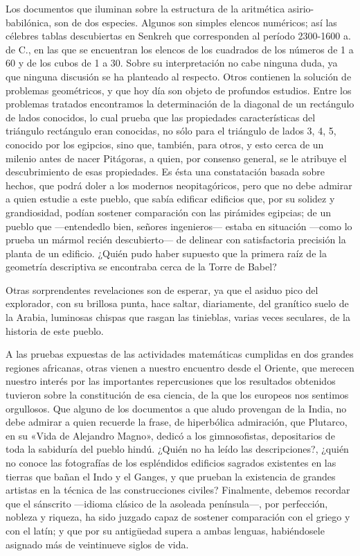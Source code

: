 \documentclass[a4paper, 12pt, draft]{article}
\begin{document}
Los documentos que iluminan sobre la estructura de la aritmética asirio-babilónica, son de dos especies. Algunos son simples elencos numéricos; así las célebres tablas descubiertas en Senkreh que corresponden al período 2300-1600 a. de C., en las que se encuentran los elencos de los cuadrados de los números de 1 a 60 y de los cubos de 1 a 30. Sobre su interpretación no cabe ninguna duda, ya que ninguna discusión se ha planteado al respecto. Otros contienen la solución de problemas geométricos, y que hoy día son objeto de profundos estudios. Entre
los problemas tratados encontramos la determinación de la diagonal de un rectángulo de lados conocidos, lo cual prueba que las propiedades características del triángulo rectángulo eran conocidas, no sólo para el triángulo de lados 3, 4, 5, conocido por los egipcios, sino que, también, para otros, y esto cerca de un milenio antes de nacer Pitágoras, a quien, por consenso general, se le atribuye el descubrimiento de esas propiedades. Es ésta una constatación basada sobre hechos, que podrá doler a los modernos neopitagóricos, pero que no debe admirar a quien estudie a este pueblo, que sabía edificar edificios que, por su solidez y grandiosidad, podían sostener comparación con las pirámides egipcias; de un pueblo que ---entendedlo bien, señores ingenieros--- estaba en situación ---como lo prueba un mármol recién descubierto--- de delinear con satisfactoria precisión la planta de un edificio. ¿Quién pudo haber supuesto que la primera raíz de la geometría descriptiva se encontraba cerca de la Torre de Babel?




Otras sorprendentes revelaciones son de esperar, ya que el asiduo pico del explorador, con su brillosa punta, hace saltar, diariamente, del granítico suelo de la Arabia, luminosas chispas que rasgan las tinieblas, varias veces seculares, de la historia de este pueblo.


A las pruebas expuestas de las actividades matemáticas cumplidas en dos grandes regiones africanas, otras vienen a nuestro encuentro desde el Oriente, que merecen nuestro interés por las importantes repercusiones que los resultados obtenidos tuvieron sobre la constitución de esa ciencia, de la que los europeos nos sentimos orgullosos. Que alguno de los documentos a que aludo provengan de la India, no debe admirar a quien recuerde la frase, de hiperbólica admiración, que Plutarco, en su «Vida de Alejandro Magno», dedicó a los gimnosofistas, depositarios de toda la sabiduría del pueblo hindú. ¿Quién no ha leído las descripciones?, ¿quién no conoce las fotografías de los espléndidos edificios sagrados existentes en las tierras que bañan el Indo y el Ganges, y que prueban la existencia de grandes artistas en la técnica de las construcciones civiles? Finalmente, debemos recordar que el sánscrito ---idioma clásico de la asoleada península---, por perfección, nobleza y riqueza, ha sido juzgado capaz de sostener comparación con el griego y con el latín; y que por su antigüedad supera a ambas lenguas, habiéndosele asignado más de veintinueve siglos de vida.
\end{document}
